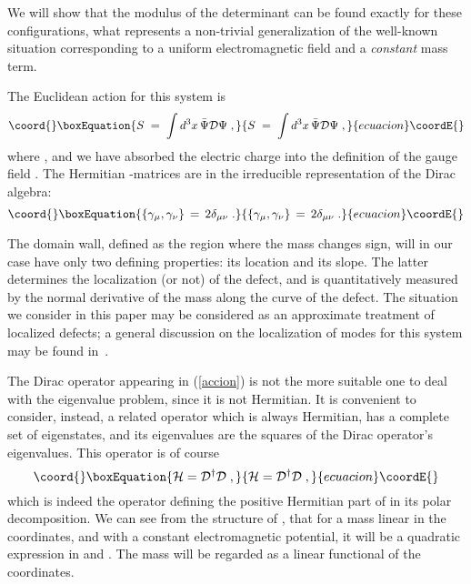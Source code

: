 \documentclass[a4paper,12pt]{article}
\begin{document}
We will show that the modulus of the determinant can be found exactly
for these configurations, what represents a non-trivial generalization
of the well-known situation corresponding to a uniform electromagnetic
field and a {\em constant\/} mass term.

The Euclidean action \coordHE{} for this system is
\begin{equation}\coord{}\boxEquation{\label{accion}
S\;=\; \int d^3x \,\bar{\Psi} {\mathcal D} \Psi \;,
}{S\;=\; \int d^3x \,\bar{\Psi} {\mathcal D} \Psi \;,
}{ecuacion}\coordE{}\end{equation}
where \coordHE{}, and we have absorbed
the electric charge into the definition of the gauge field \coordHE{}. The
Hermitian \myHighlight{$\gamma$}\coordHE{}-matrices are in the irreducible \coordHE{} representation of
the Dirac algebra:
\begin{equation}\coord{}\boxEquation{\label{gammas}
\{\gamma_{\mu},\gamma_{\nu}\}\,=\,2\delta_{\mu\nu} \;.
}{\{\gamma_{\mu},\gamma_{\nu}\}\,=\,2\delta_{\mu\nu} \;.
}{ecuacion}\coordE{}\end{equation}

The domain wall, defined as the region where the mass changes sign,
will in our case have only two defining properties: its location and
its slope.  The latter determines the localization (or not) of the
defect, and is quantitatively measured by the normal derivative of the
mass along the curve of the defect. The situation we consider in this
paper may be considered as an approximate treatment of localized
defects; a general discussion on the localization of modes for this
system may be found in~\cite{paper2+1}.


The Dirac operator \coordHE{} appearing in (\ref{accion}) is not
the more suitable one to deal with the eigenvalue problem, since it is
not Hermitian.  It is convenient to consider, instead, a related
operator \coordHE{} which is always Hermitian, has a complete set
of eigenstates, and its eigenvalues are the squares of the Dirac
operator's eigenvalues.  This operator \coordHE{} is of course
\begin{equation}\coord{}\boxEquation{\label{hermitico}
{\mathcal H}={\mathcal D}^\dagger {\mathcal D}\;,
}{{\mathcal H}={\mathcal D}^\dagger {\mathcal D}\;,
}{ecuacion}\coordE{}\end{equation}
which is indeed the operator defining the positive Hermitian part of
\coordHE{} in its polar decomposition.  We can see from the
structure of \coordHE{}, that for a mass linear in the
coordinates, and with a constant electromagnetic potential, it will be
a quadratic expression in \coordHE{} and \coordHE{}.  The mass will be regarded
as a linear functional of the coordinates.
\end{document}
